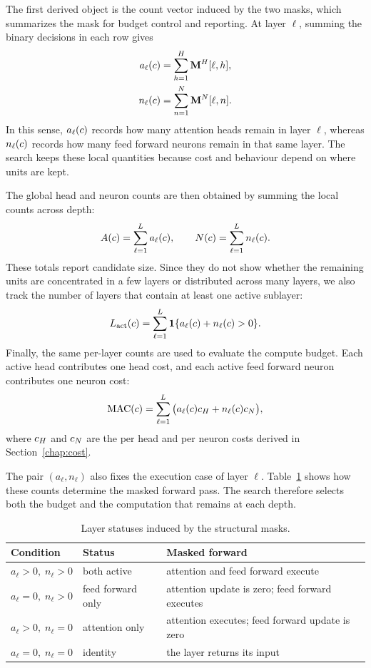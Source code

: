 The first derived object is the count vector induced by the two masks, which summarizes the mask for budget control and reporting. At layer $\ell$, summing the binary decisions in each row gives
\begin{align}
a_\ell(c) &= \sum_{h=1}^{H} \mathbf{M}^{H}[\ell,h], \\
n_\ell(c) &= \sum_{n=1}^{N} \mathbf{M}^{N}[\ell,n].
\end{align}
In this sense, $a_\ell(c)$ records how many attention heads remain in layer $\ell$, whereas $n_\ell(c)$ records how many feed forward neurons remain in that same layer. The search keeps these local quantities because cost and behaviour depend on where units are kept.

The global head and neuron counts are then obtained by summing the local counts across depth:
\begin{equation}
A(c)=\sum_{\ell=1}^{L} a_\ell(c),
\qquad
N(c)=\sum_{\ell=1}^{L} n_\ell(c).
\end{equation}
These totals report candidate size. Since they do not show whether the remaining units are concentrated in a few layers or distributed across many layers, we also track the number of layers that contain at least one active sublayer:
\begin{equation}
L_{\mathrm{act}}(c)
=
\sum_{\ell=1}^{L}
\mathbf{1}\{a_\ell(c) + n_\ell(c) > 0\}.
\end{equation}
Finally, the same per-layer counts are used to evaluate the compute budget. Each active head contributes one head cost, and each active feed forward neuron contributes one neuron cost:
\begin{equation}
\mathrm{MAC}(c)
=
\sum_{\ell=1}^{L}
\big(a_\ell(c)c_{H}+n_\ell(c)c_{N}\big),
\end{equation}
where $c_{H}$ and $c_{N}$ are the per head and per neuron costs derived in Section~\ref{chap:cost}.

The pair $(a_\ell,n_\ell)$ also fixes the execution case of layer $\ell$. Table~\ref{tab:layer_statuses} shows how these counts determine the masked forward pass. The search therefore selects both the budget and the computation that remains at each depth.

\begin{table}[h]
\centering
\footnotesize
\setlength{\tabcolsep}{4pt}
\begin{tabularx}{0.86\textwidth}{llX}
\toprule
Condition & Status & Masked forward \\
\midrule
$a_\ell>0,\;n_\ell>0$ & both active &
attention and feed forward execute \\
$a_\ell=0,\;n_\ell>0$ & feed forward only &
attention update is zero; feed forward executes \\
$a_\ell>0,\;n_\ell=0$ & attention only &
attention executes; feed forward update is zero \\
$a_\ell=0,\;n_\ell=0$ & identity &
the layer returns its input \\
\bottomrule
\end{tabularx}
\caption{Layer statuses induced by the structural masks.}
\label{tab:layer_statuses}
\end{table}

